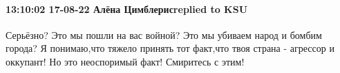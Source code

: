  
 
 
 
 

\paragraph{13:10:02 17-08-22 Алёна Цимблерисreplied to KSU}

Серьёзно? Это мы пошли на вас войной? Это мы убиваем народ и бомбим города? Я
понимаю,что тяжело принять тот факт,что твоя страна - агрессор и оккупант! Но
это неоспоримый факт! Смиритесь с этим!
